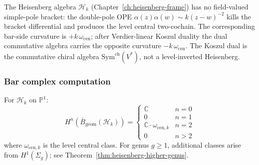The Heisenberg algebra $\mathcal{H}_k$ (Chapter~\ref{ch:heisenberg-frame})
has no field-valued simple-pole bracket: the double-pole OPE
$\alpha(z)\alpha(w) \sim k(z-w)^{-2}$ kills the bracket differential
and produces the level central two-cochain. The corresponding
bar-side curvature is $+k\,\omega_{\mathrm{cen}}$; after
Verdier-linear Koszul duality the dual commutative algebra carries
the opposite curvature $-k\,\omega_{\mathrm{cen}}$.
The Koszul dual is the commutative chiral
algebra $\mathrm{Sym}^{\mathrm{ch}}(V^*)$, not a level-inverted
Heisenberg.

\subsubsection{Bar complex computation}
\label{sec:heisenberg-bar-complex}

\begin{theorem}\label{thm:heisenberg-bar}
For $\mathcal{H}_k$ on $\mathbb{P}^1$:
\[
H^n(\bar{B}_{\text{geom}}(\mathcal{H}_k)) =
\begin{cases}
\mathbb{C} & n = 0 \\
0 & n = 1 \\
\mathbb{C} \cdot \omega_{\mathrm{cen},k} & n = 2 \\
0 & n > 2
\end{cases}
\]
where $\omega_{\mathrm{cen},k}$ is the level central class. For genus
$g \geq 1$, additional classes arise from $H^1(\Sigma_g)$; see
Theorem~\ref{thm:heisenberg-higher-genus}.
\end{theorem}


